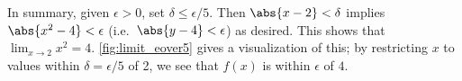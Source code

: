 \begin{example}
In summary, given $\epsilon > 0$, set $\delta\leq\epsilon/5$.  Then $\abs{x - 2} < \delta$ implies 
$\abs{x^2 - 4}< \epsilon$ (i.e.\ $\abs{y - 4}< \epsilon$) as desired.  This shows that $\displaystyle \lim_{x\rightarrow 2} x^2 = 4 $. \autoref{fig:limit_eover5} gives a visualization of this; by restricting $x$ to values within $\delta = \epsilon/5$ of 2, we see that $f(x)$ is within $\epsilon$ of $4$.
\end{example}

%
%
%
%
